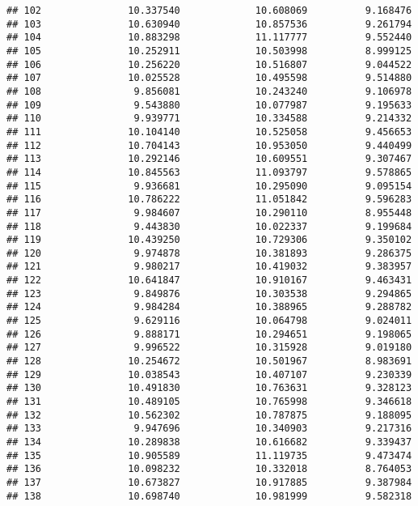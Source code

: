 \documentclass[
]{article}
\begin{document}
\begin{verbatim}
## 102               10.337540             10.608069          9.168476
## 103               10.630940             10.857536          9.261794
## 104               10.883298             11.117777          9.552440
## 105               10.252911             10.503998          8.999125
## 106               10.256220             10.516807          9.044522
## 107               10.025528             10.495598          9.514880
## 108                9.856081             10.243240          9.106978
## 109                9.543880             10.077987          9.195633
## 110                9.939771             10.334588          9.214332
## 111               10.104140             10.525058          9.456653
## 112               10.704143             10.953050          9.440499
## 113               10.292146             10.609551          9.307467
## 114               10.845563             11.093797          9.578865
## 115                9.936681             10.295090          9.095154
## 116               10.786222             11.051842          9.596283
## 117                9.984607             10.290110          8.955448
## 118                9.443830             10.022337          9.199684
## 119               10.439250             10.729306          9.350102
## 120                9.974878             10.381893          9.286375
## 121                9.980217             10.419032          9.383957
## 122               10.641847             10.910167          9.463431
## 123                9.849876             10.303538          9.294865
## 124                9.984284             10.388965          9.288782
## 125                9.629116             10.064798          9.024011
## 126                9.888171             10.294651          9.198065
## 127                9.996522             10.315928          9.019180
## 128               10.254672             10.501967          8.983691
## 129               10.038543             10.407107          9.230339
## 130               10.491830             10.763631          9.328123
## 131               10.489105             10.765998          9.346618
## 132               10.562302             10.787875          9.188095
## 133                9.947696             10.340903          9.217316
## 134               10.289838             10.616682          9.339437
## 135               10.905589             11.119735          9.473474
## 136               10.098232             10.332018          8.764053
## 137               10.673827             10.917885          9.387984
## 138               10.698740             10.981999          9.582318

\end{verbatim}
\end{document}
